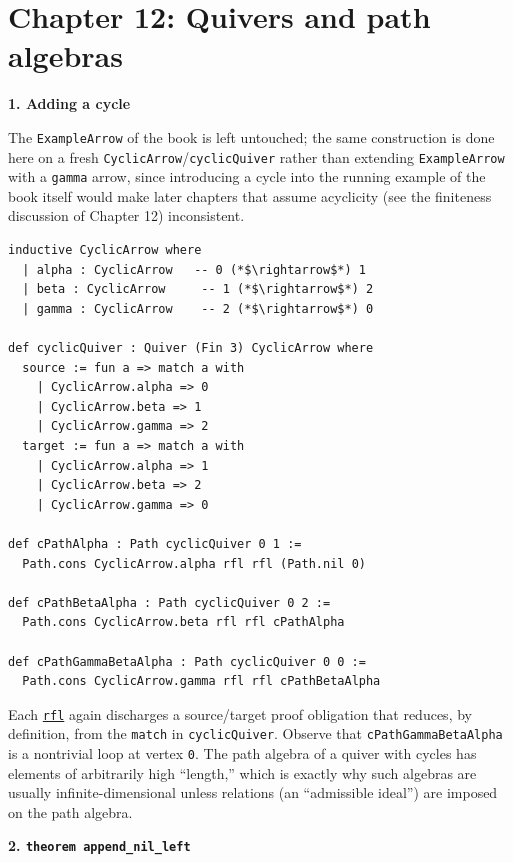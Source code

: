 \section{Chapter 12: Quivers and path algebras}\label{sec:15-appendix-solutions:12-chapter-12:1}

\textbf{1. Adding a cycle}

The \texttt{ExampleArrow} of the book is left untouched; the same construction is done here on a fresh \texttt{CyclicArrow}/\texttt{cyclicQuiver} rather than extending \texttt{ExampleArrow} with a \texttt{gamma} arrow, since introducing a cycle into the running example of the book itself would make later chapters that assume acyclicity (see the finiteness discussion of Chapter 12) inconsistent.

\begin{lstlisting}
inductive CyclicArrow where
  | alpha : CyclicArrow   -- 0 (*$\rightarrow$*) 1
  | beta : CyclicArrow     -- 1 (*$\rightarrow$*) 2
  | gamma : CyclicArrow    -- 2 (*$\rightarrow$*) 0

def cyclicQuiver : Quiver (Fin 3) CyclicArrow where
  source := fun a => match a with
    | CyclicArrow.alpha => 0
    | CyclicArrow.beta => 1
    | CyclicArrow.gamma => 2
  target := fun a => match a with
    | CyclicArrow.alpha => 1
    | CyclicArrow.beta => 2
    | CyclicArrow.gamma => 0

def cPathAlpha : Path cyclicQuiver 0 1 :=
  Path.cons CyclicArrow.alpha rfl rfl (Path.nil 0)

def cPathBetaAlpha : Path cyclicQuiver 0 2 :=
  Path.cons CyclicArrow.beta rfl rfl cPathAlpha

def cPathGammaBetaAlpha : Path cyclicQuiver 0 0 :=
  Path.cons CyclicArrow.gamma rfl rfl cPathBetaAlpha
\end{lstlisting}

Each \href{https://lean-lang.org/doc/reference/latest/Tactic-Proofs/Tactic-Reference/}{\texttt{rfl}} again discharges a source/target proof obligation that reduces, by definition, from the \texttt{match} in \texttt{cyclicQuiver}. Observe that \texttt{cPathGammaBetaAlpha} is a nontrivial loop at vertex \texttt{0}. The path algebra of a quiver with cycles has elements of arbitrarily high ``length,'' which is exactly why such algebras are usually infinite-dimensional unless relations (an ``admissible ideal'') are imposed on the path algebra.

\textbf{2. \texttt{theorem append\_\allowbreak{}nil\_\allowbreak{}left}}

